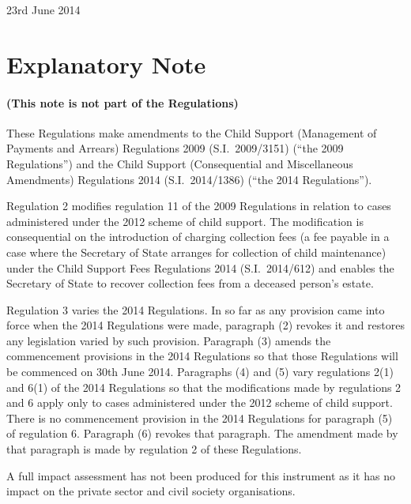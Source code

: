 \documentclass[12pt,a4paper]{article}
\begin{document}
23rd June 2014

\small

\part{Explanatory Note}

\renewcommand\parthead{— Explanatory Note}

\subsection*{(This note is not part of the Regulations)}

These Regulations make amendments to the Child Support (Management of Payments and Arrears) Regulations 2009 (S.I.~2009/3151) (“the 2009 Regulations”) and the Child Support (Consequential and Miscellaneous Amendments) Regulations 2014 (S.I.~2014/1386) (“the 2014 Regulations”).

Regulation 2 modifies regulation 11 of the 2009 Regulations in relation to cases administered under the 2012 scheme of child support. The modification is consequential on the introduction of charging collection fees (a fee payable in a case where the Secretary of State arranges for collection of child maintenance) under the Child Support Fees Regulations 2014 (S.I.~2014/612) and enables the Secretary of State to recover collection fees from a deceased person’s estate.

Regulation 3 varies the 2014 Regulations. In so far as any provision came into force when the 2014 Regulations were made, paragraph (2) revokes it and restores any legislation varied by such provision. Paragraph (3) amends the commencement provisions in the 2014 Regulations so that those Regulations will be commenced on 30th June 2014. Paragraphs (4) and (5) vary regulations 2(1) and 6(1) of the 2014 Regulations so that the modifications made by regulations 2 and 6 apply only to cases administered under the 2012 scheme of child support. There is no commencement provision in the 2014 Regulations for paragraph (5) of regulation 6. Paragraph (6) revokes that paragraph. The amendment made by that paragraph is made by regulation 2 of these Regulations.

A full impact assessment has not been produced for this instrument as it has no impact on the private sector and civil society organisations. 
\end{document}
